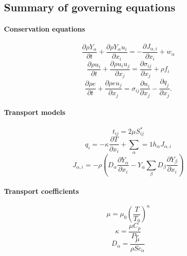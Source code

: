 \documentclass[oneside,a4paper,11pt]{report}
\begin{document}
\subsection{Summary of governing equations}
\label{sec:multi_species_eqs}

\paragraph{Conservation equations}

\begin{equation*}
    \frac{\partial\rho Y_\alpha}{\partial t}+\frac{\partial \rho Y_\alpha u_i}{\partial x_i} = -\frac{\partial J_{\alpha,i}}{\partial x_i} + w_\alpha
\end{equation*}
\begin{equation*}
    \frac{\partial \rho u_i}{\partial t} + \frac{\partial \rho u_i u_j}{\partial x_j} = \frac{\partial \sigma_{ij}}{\partial x_j} + \rho f_i
\end{equation*}
\begin{equation*}
    \frac{ \partial \rho e}{\partial t} + \frac{\partial \rho e u_j}{\partial x_j} = \sigma_{ij} \frac{\partial u_i}{\partial x_j} - \frac{\partial q_j}{\partial x_j}.
\end{equation*}

\paragraph{Transport models}

\begin{equation*}
t_{ij} = 2\mu S_{ij}^*
\end{equation*}
\begin{equation*}
q_i = -\kappa \frac{\partial T}{\partial x_i}  + \sum_\alpha=1 h_\alpha J_{\alpha,i}
\end{equation*}
\begin{equation*}
J_{\alpha,i} = -\rho \left ( D_\alpha \frac{\partial Y_\alpha}{\partial x_i} - Y_\alpha \sum_\beta D_\beta \frac{\partial Y_\beta}{\partial x_i} \right )
\end{equation*}

\paragraph{Transport coefficients}

\begin{equation*}
\mu = \mu_0 \left ( \frac{T}{T_0} \right )^n
\end{equation*}
\begin{equation*}
\kappa = \frac{\mu C_p}{Pr}
\end{equation*}
\begin{equation*}
D_\alpha = \frac{\mu}{\rho Sc_\alpha}
\end{equation*}
\end{document}
